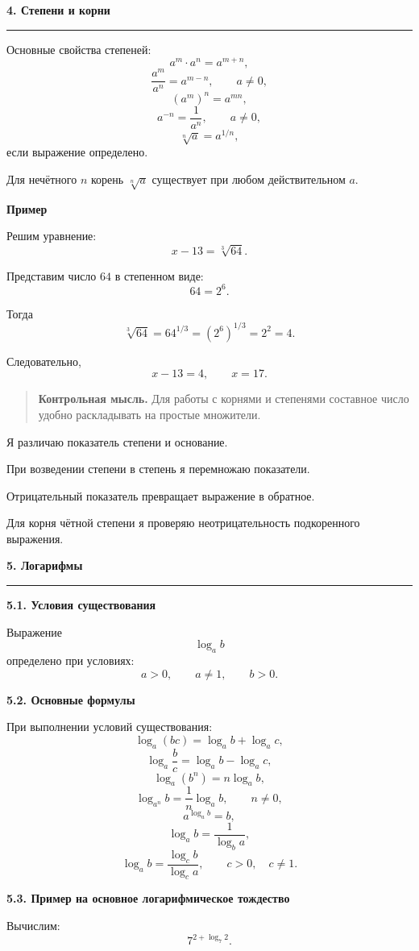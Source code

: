 \documentclass[a4paper,12pt]{article}
\newcommand{\topic}[1]{%
  \par\bigskip
  {\Large\bfseries\color{darkaccent}#1\par}
  \vspace{0.2em}
  {\color{accent}\rule{\linewidth}{0.7pt}}
  \vspace{0.55em}
}
\newcommand{\subtopic}[1]{%
  \par\medskip
  {\large\bfseries\color{darkaccent}#1\par}
  \vspace{0.2em}
}
\newcommand{\control}[1]{%
  \begin{quote}
    \color{darkaccent}\textbf{Контрольная мысль.}\;
    \color{textgray}#1
  \end{quote}
}
\begin{document}
\topic{4. Степени и корни}

Основные свойства степеней:
\[
a^m\cdot a^n=a^{m+n},
\]
\[
\frac{a^m}{a^n}=a^{m-n},
\qquad a\ne0,
\]
\[
\left(a^m\right)^n=a^{mn},
\]
\[
a^{-n}=\frac1{a^n},
\qquad a\ne0,
\]
\[
\sqrt[n]{a}=a^{1/n},
\]
если выражение определено.

Для нечётного \(n\) корень \(\sqrt[n]{a}\) существует при любом
действительном \(a\).

\subtopic{Пример}

Решим уравнение:
\[
x-13=\sqrt[3]{64}.
\]

Представим число \(64\) в степенном виде:
\[
64=2^6.
\]

Тогда
\[
\sqrt[3]{64}
=
64^{1/3}
=
\left(2^6\right)^{1/3}
=
2^2
=
4.
\]

Следовательно,
\[
x-13=4,
\qquad
x=17.
\]

\control{Для работы с корнями и степенями составное число удобно раскладывать на простые множители.}

\begin{checklist}
  \item Я различаю показатель степени и основание.
  \item При возведении степени в степень я перемножаю показатели.
  \item Отрицательный показатель превращает выражение в обратное.
  \item Для корня чётной степени я проверяю неотрицательность подкоренного выражения.
\end{checklist}

\topic{5. Логарифмы}

\subtopic{5.1. Условия существования}

Выражение
\[
\log_a b
\]
определено при условиях:
\[
a>0,
\qquad
a\ne1,
\qquad
b>0.
\]

\subtopic{5.2. Основные формулы}

При выполнении условий существования:
\[
\log_a(bc)
=
\log_a b+\log_a c,
\]
\[
\log_a\frac bc
=
\log_a b-\log_a c,
\]
\[
\log_a(b^n)
=
n\log_a b,
\]
\[
\log_{a^n}b
=
\frac1n\log_a b,
\qquad n\ne0,
\]
\[
a^{\log_a b}=b,
\]
\[
\log_a b
=
\frac1{\log_b a},
\]
\[
\log_a b
=
\frac{\log_c b}{\log_c a},
\qquad
c>0,\quad c\ne1.
\]

\subtopic{5.3. Пример на основное логарифмическое тождество}

Вычислим:
\[
7^{2+\log_7 2}.
\]
\end{document}
